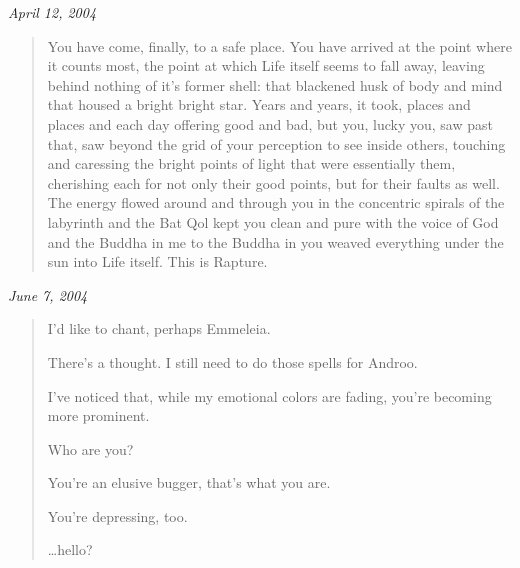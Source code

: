 \begin{rightcolumn*}
\begin{flushright}
    \emph{April 12, 2004}
\end{flushright}
\end{rightcolumn*}
\begin{leftcolumn}
\begin{quotation}
\noindent You have come, finally, to a safe place. You have arrived at the point where it counts most, the point at which Life itself seems to fall away, leaving behind nothing of it's former shell: that blackened husk of body and mind that housed a bright bright star. Years and years, it took, places and places and each day offering good and bad, but you, lucky you, saw past that, saw beyond the grid of your perception to see inside others, touching and caressing the bright points of light that were essentially them, cherishing each for not only their good points, but for their faults as well. The energy flowed around and through you in the concentric spirals of the labyrinth and the Bat Qol kept you clean and pure with the voice of God and the Buddha in me to the Buddha in you weaved everything under the sun into Life itself. This is Rapture.
\end{quotation}
\newpage
\end{leftcolumn}
\begin{rightcolumn*}
\begin{flushright}
    \emph{June 7, 2004}
\end{flushright}
\end{rightcolumn*}
\begin{leftcolumn}
\begin{quotation}
\noindent I'd like to chant, perhaps Emmeleia.


\noindent There's a thought. I still need to do those spells for Androo.


\noindent I've noticed that, while my emotional colors are fading, you're becoming more prominent.

Who are you?


\noindent You're an elusive bugger, that's what you are.


\noindent You're depressing, too.

\vspace{2\onelineskip}

\noindent\ldots{}hello?
\end{quotation}
\newpage
\end{leftcolumn}
